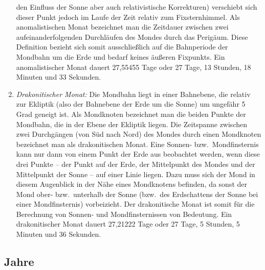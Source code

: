 \begin{enumerate}
den Einfluss der Sonne aber auch relativistische Korrekturen) verschiebt sich dieser Punkt
jedoch im Laufe der Zeit relativ zum Fixsternhimmel. Als anomalistischen Monat bezeichnet man
die Zeitdauer zwischen zwei aufeinanderfolgenden Durchl\"aufen des Mondes durch das
Perig\"aum. Diese Definition bezieht sich somit ausschlie\ss lich auf die Bahnperiode der
Mondbahn um die Erde und bedarf keines \"au\ss eren Fixpunkts. 
Ein anomalistischer Monat dauert 27,55455 Tage oder 27 Tage, 13 Stunden, 18
Minuten und 33 Sekunden. 
\item
\textit{Drakonitischer Monat:}
Die Mondbahn liegt in einer Bahnebene, die relativ zur Ekliptik (also der Bahnebene der
Erde um die Sonne) um ungef\"ahr 5 Grad geneigt ist. Als Mondknoten bezeichnet man
die beiden Punkte der Mondbahn, die in der Ebene der Ekliptik liegen. Die Zeitspanne
zwischen zwei Durchg\"angen (von S\"ud nach Nord) des Mondes durch einen Mondknoten
bezeichnet man als drakonitischen Monat. Eine Sonnen- bzw.\ Mondfinsternis kann nur
dann von einem Punkt der Erde aus beobachtet werden, wenn diese drei Punkte -- der Punkt 
auf der Erde, der Mittelpunkt des Mondes und der Mittelpunkt der
Sonne -- auf einer Linie liegen. Dazu muss sich der Mond in diesem Augenblick in der
N\"ahe eines Mondknotens befinden, da sonst der Mond ober- bzw.\ unterhalb der Sonne
(bzw.\ des Erdschattens der Sonne bei einer Mondfinsternis) vorbeizieht. Der 
drakonitische Monat ist somit f\"ur die Berechnung von Sonnen- und Mondfinsternissen von
Bedeutung. Ein drakonitischer Monat dauert 27,21222 Tage oder 27 Tage, 5 Stunden, 5
Minuten und 36 Sekunden. 
\end{enumerate}

\subsection{Jahre}

